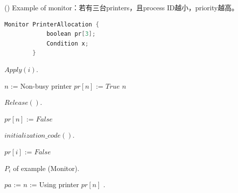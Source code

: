 \begin{theorem}{()} Example of monitor：若有三台printers，且process ID越小，priority越高。
    \begin{lstlisting}[caption={Data structure (example (Monitor))}, language=C, captionpos=b, mathescape=true]
        Monitor PrinterAllocation {
            boolean pr[3];
            Condition x;
        } 
    \end{lstlisting}
    \begin{algorithm}[H]
        \caption{$Apply(i)$.}
        \begin{algorithmic}[1]
                    \State {}
                \Else
                    \State $n$ := Non-busy printer
                    \State $pr[n]$ := $True$
                    \State \Return $n$
                \EndIf
            \EndFunction
        \end{algorithmic}
    \end{algorithm}
    \begin{algorithm}[H]
        \caption{$Release()$.}
        \begin{algorithmic}[1]
                \State $pr[n]$ := $False$
                \State {}
            \EndFunction
        \end{algorithmic}
    \end{algorithm}
    \begin{algorithm}[H]
        \caption{$initialization\_code()$.}
        \begin{algorithmic}[1]
                    \State $pr[i]$ := $False$
                \EndFor
            \EndFunction
        \end{algorithmic}
    \end{algorithm}
    \begin{algorithm}[H]
        \caption{$P_i$ of example (Monitor).}
        \begin{algorithmic}[1]
                \State $pa$ :=   
                \State $n$ := 
                \State Using printer $pr[n]$ .
                \State {}
            \EndFunction
        \end{algorithmic}
    \end{algorithm}
\end{theorem}

